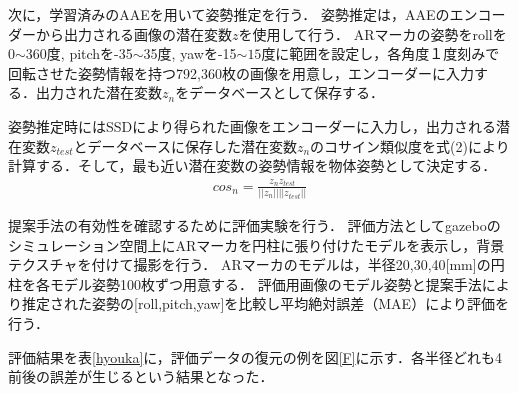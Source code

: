 \documentclass{jsarticle}
\begin{document}
次に，学習済みのAAEを用いて姿勢推定を行う．
姿勢推定は，AAEのエンコーダーから出力される画像の潜在変数$z$を使用して行う．
ARマーカの姿勢をrollを0$\sim$360度, pitchを-35$\sim$35度, yawを-15$\sim15$度に範囲を設定し，各角度１度刻みで回転させた姿勢情報を持つ792,360枚の画像を用意し，エンコーダーに入力する．出力された潜在変数$z_n$をデータベースとして保存する．

姿勢推定時にはSSDにより得られた画像をエンコーダーに入力し，出力される潜在変数$z_{test}$とデータベースに保存した潜在変数$z_n$のコサイン類似度を式(2)により計算する．そして，最も近い潜在変数の姿勢情報を物体姿勢として決定する．
\begin{eqnarray}
\label{cos}
cos_n=\frac{z_n z_{test}}{||z_n|| ||z_{test}||}
\end{eqnarray}







提案手法の有効性を確認するために評価実験を行う．
評価方法としてgazeboのシミュレーション空間上にARマーカを円柱に張り付けたモデルを表示し，背景テクスチャを付けて撮影を行う．
ARマーカのモデルは，半径20,30,40[mm]の円柱を各モデル姿勢100枚ずつ用意する．
評価用画像のモデル姿勢と提案手法により推定された姿勢の[roll,pitch,yaw]を比較し平均絶対誤差（MAE）により評価を行う．

評価結果を表\ref{hyouka}に，評価データの復元の例を図\ref{F}に示す．各半径どれも4前後の誤差が生じるという結果となった．
\end{document}
